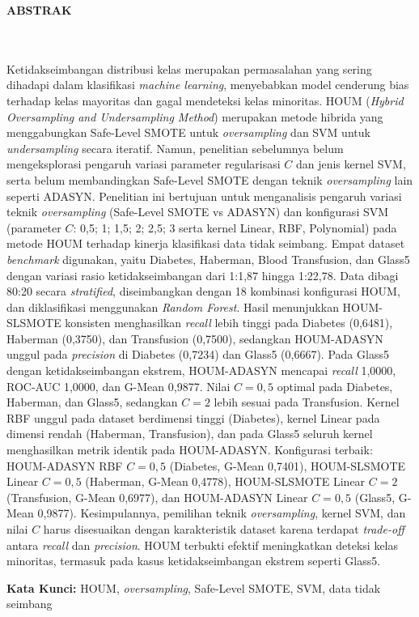 \clearpage
{}%
\thispagestyle{fancy}

\begin{center}
	\large \bfseries \MakeUppercase{Abstrak}\\
	\normalsize \normalfont {\thetitle}\\
	\normalsize \normalfont {\theauthor}\\
	\bigskip
	
	\normalsize \normalfont \justifying \singlespacing
	Ketidakseimbangan distribusi kelas merupakan permasalahan yang sering dihadapi dalam klasifikasi \textit{machine learning}, menyebabkan model cenderung bias terhadap kelas mayoritas dan gagal mendeteksi kelas minoritas. HOUM (\textit{Hybrid Oversampling and Undersampling Method}) merupakan metode hibrida yang menggabungkan Safe-Level SMOTE untuk \textit{oversampling} dan SVM untuk \textit{undersampling} secara iteratif. Namun, penelitian sebelumnya belum mengeksplorasi pengaruh variasi parameter regularisasi $C$ dan jenis kernel SVM, serta belum membandingkan Safe-Level SMOTE dengan teknik \textit{oversampling} lain seperti ADASYN. Penelitian ini bertujuan untuk menganalisis pengaruh variasi teknik \textit{oversampling} (Safe-Level SMOTE vs ADASYN) dan konfigurasi SVM (parameter $C$: 0,5; 1; 1,5; 2; 2,5; 3 serta kernel Linear, RBF, Polynomial) pada metode HOUM terhadap kinerja klasifikasi data tidak seimbang. Empat dataset \textit{benchmark} digunakan, yaitu Diabetes, Haberman, Blood Transfusion, dan Glass5 dengan variasi rasio ketidakseimbangan dari 1:1,87 hingga 1:22,78. Data dibagi 80:20 secara \textit{stratified}, diseimbangkan dengan 18 kombinasi konfigurasi HOUM, dan diklasifikasi menggunakan \textit{Random Forest}. Hasil menunjukkan HOUM-SLSMOTE konsisten menghasilkan \textit{recall} lebih tinggi pada Diabetes (0,6481), Haberman (0,3750), dan Transfusion (0,7500), sedangkan HOUM-ADASYN unggul pada \textit{precision} di Diabetes (0,7234) dan Glass5 (0,6667). Pada Glass5 dengan ketidakseimbangan ekstrem, HOUM-ADASYN mencapai \textit{recall} 1,0000, ROC-AUC 1,0000, dan G-Mean 0,9877. Nilai $C=0,5$ optimal pada Diabetes, Haberman, dan Glass5, sedangkan $C=2$ lebih sesuai pada Transfusion. Kernel RBF unggul pada dataset berdimensi tinggi (Diabetes), kernel Linear pada dimensi rendah (Haberman, Transfusion), dan pada Glass5 seluruh kernel menghasilkan metrik identik pada HOUM-ADASYN. Konfigurasi terbaik: HOUM-ADASYN RBF $C=0,5$ (Diabetes, G-Mean 0,7401), HOUM-SLSMOTE Linear $C=0,5$ (Haberman, G-Mean 0,4778), HOUM-SLSMOTE Linear $C=2$ (Transfusion, G-Mean 0,6977), dan HOUM-ADASYN Linear $C=0,5$ (Glass5, G-Mean 0,9877). Kesimpulannya, pemilihan teknik \textit{oversampling}, kernel SVM, dan nilai $C$ harus disesuaikan dengan karakteristik dataset karena terdapat \textit{trade-off} antara \textit{recall} dan \textit{precision}. HOUM terbukti efektif meningkatkan deteksi kelas minoritas, termasuk pada kasus ketidakseimbangan ekstrem seperti Glass5.

    \vspace{20pt}
	\raggedright \textbf{Kata Kunci:} HOUM, \textit{oversampling}, Safe-Level SMOTE, SVM, data tidak seimbang
	
	\vfill
	
\end{center}
\clearpage
